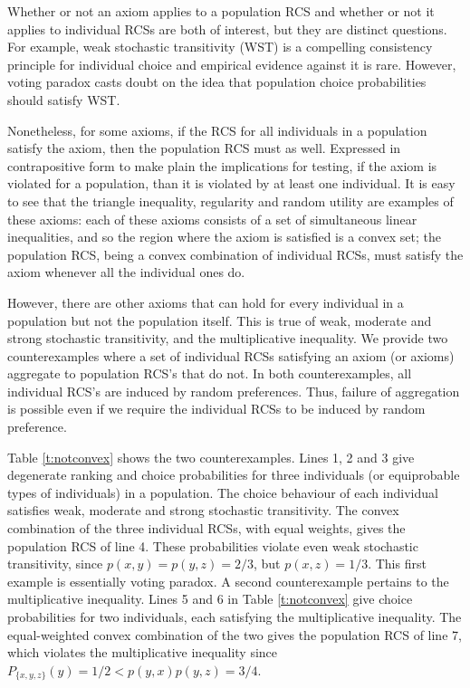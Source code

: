 \documentclass[11pt,letter]{article}
\begin{document}
Whether or not an axiom applies to a population RCS and whether or not it applies to individual RCSs are both of interest, but they are distinct questions.
For example, weak stochastic transitivity (WST) is a compelling consistency principle for individual choice and empirical evidence against it is rare. However,  voting paradox casts doubt on the idea that population choice probabilities should satisfy WST.

Nonetheless, for some axioms, if the RCS for all individuals in a population satisfy the axiom, then the population RCS must as well.
Expressed in contrapositive form to make plain the implications for testing, if the axiom is violated for a population, than it is violated by at least one individual.
It is easy to see that the triangle inequality, regularity and random utility are examples of these axioms:
each of these axioms consists of a set of simultaneous linear inequalities, and so the region where the axiom is satisfied is a convex set; the population RCS, being a convex combination of individual RCSs, must satisfy the axiom whenever all the individual ones do.

However, there are other axioms that can hold for every individual in a population but not the population itself.
This is true of weak, moderate and strong stochastic transitivity, and the multiplicative inequality.
We provide two counterexamples where a set of individual RCSs satisfying an axiom (or axioms) aggregate to population RCS's that do not.
In both counterexamples, all individual RCS's are induced by random preferences.
Thus, failure of aggregation is possible even if we require the individual RCSs to be induced by random preference.

Table \ref{t:notconvex} shows the two counterexamples. 
Lines 1, 2 and 3 give degenerate ranking and choice probabilities for three individuals (or equiprobable types of individuals) in a population.
The choice behaviour of each individual satisfies weak, moderate and strong stochastic transitivity.
The convex combination of the three individual RCSs, with equal weights, gives the population RCS of line 4.
These probabilities violate even weak stochastic transitivity, since $p(x,y) = p(y,z) = 2/3$, but $p(x,z) = 1/3$.
This first example is essentially  voting paradox.
A second counterexample pertains to the multiplicative inequality.
Lines 5 and 6 in Table \ref{t:notconvex} give choice probabilities for two individuals, each satisfying the multiplicative inequality.
The equal-weighted convex combination of the two gives the population RCS of line 7,
which violates the multiplicative inequality since $P_{\{x,y,z\}}(y) = 1/2 < p(y,x)p(y,z) = 3/4$.
\end{document}
